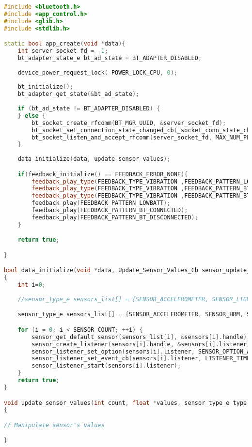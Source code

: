 \bigskip
\begin{lstlisting}[language=C++]
#include <bluetooth.h>
#include <app_control.h>
#include <glib.h>
#include <stdlib.h>

static bool app_create(void *data){
	int server_socket_fd = -1;
	bt_adapter_state_e bt_ad_state = BT_ADAPTER_DISABLED;
	
	device_power_request_lock( POWER_LOCK_CPU, 0);
	
	bt_initialize();
	bt_adapter_get_state(&bt_ad_state);
	
	if (bt_ad_state != BT_ADAPTER_DISABLED) {
	} else {			
		bt_socket_create_rfcomm(BT_MGR_UUID, &server_socket_fd);
		bt_socket_set_connection_state_changed_cb(_socket_conn_state_changed_cb);
		bt_socket_listen_and_accept_rfcomm(server_socket_fd, MAX_NUM_PENDING);
	}
	
	data_initialize(data, update_sensor_values);

	if(feedback_initialize() == FEEDBACK_ERROR_NONE){
		feedback_play_type(FEEDBACK_TYPE_VIBRATION ,FEEDBACK_PATTERN_LOWBATT);
		feedback_play_type(FEEDBACK_TYPE_VIBRATION ,FEEDBACK_PATTERN_BT_CONNECTED);
		feedback_play_type(FEEDBACK_TYPE_VIBRATION ,FEEDBACK_PATTERN_BT_DISCONNECTED);
		feedback_play(FEEDBACK_PATTERN_LOWBATT);
		feedback_play(FEEDBACK_PATTERN_BT_CONNECTED);
		feedback_play(FEEDBACK_PATTERN_BT_DISCONNECTED);
	}

	return true;

}

bool data_initialize(void *data, Update_Sensor_Values_Cb sensor_update_cb)
{
	int i=0;
	
	//sensor_type_e sensors_list[] = {SENSOR_ACCELEROMETER, SENSOR_LIGHT, SENSOR_PRESSURE, SENSOR_HRM, SENSOR_HRM_LED_GREEN};

	sensor_type_e sensors_list[] = {SENSOR_ACCELEROMETER, SENSOR_HRM, SENSOR_HRM_LED_GREEN};

	for (i = 0; i < SENSOR_COUNT; ++i) {
		sensor_get_default_sensor(sensors_list[i], &sensors[i].handle);
		sensor_create_listener(sensors[i].handle, &sensors[i].listener);
		sensor_listener_set_option(sensors[i].listener, SENSOR_OPTION_ALWAYS_ON);
		sensor_listener_set_event_cb(sensors[i].listener, LISTENER_TIMEOUT, sensor_update_cb, i);
		sensor_listener_start(sensors[i].listener);
	}
	return true;
}

void update_sensor_values(int count, float *values, sensor_type_e type, appdata_s *ad)
{

// Manipulate sensor's values

}
\end{lstlisting}
\bigskip

